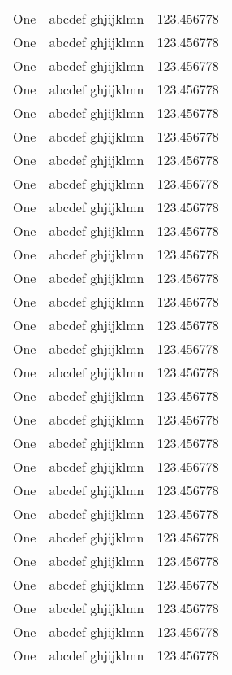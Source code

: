 \begin{landscape}
\begin{center}
\tablelasttail{\hline}
\par
\begin{supertabular}{| r @{\quad -sep- }| r@{\hspace{6 cm}}| r |}
One & abcdef ghjijklmn & 123.456778 \\
One & abcdef ghjijklmn & 123.456778 \\
One & abcdef ghjijklmn & 123.456778 \\
One & abcdef ghjijklmn & 123.456778 \\[5mm]%
One & abcdef ghjijklmn & 123.456778 \\
One & abcdef ghjijklmn & 123.456778 \\
One & abcdef ghjijklmn & 123.456778 \\
One & abcdef ghjijklmn & 123.456778 \\
One & abcdef ghjijklmn & 123.456778 \\
\hline
One & abcdef ghjijklmn & 123.456778 \\
One & abcdef ghjijklmn & 123.456778 \\
One & abcdef ghjijklmn & 123.456778 \\
One & abcdef ghjijklmn & 123.456778 \\
One & abcdef ghjijklmn & 123.456778 \\
One & abcdef ghjijklmn & 123.456778 \\
One & abcdef ghjijklmn & 123.456778 \\
One & abcdef ghjijklmn & 123.456778 \\
One & abcdef ghjijklmn & 123.456778 \\
One & abcdef ghjijklmn & 123.456778 \\
One & abcdef ghjijklmn & 123.456778 \\
One & abcdef ghjijklmn & 123.456778 \\
One & abcdef ghjijklmn & 123.456778 \\
One & abcdef ghjijklmn & 123.456778 \\
One & abcdef ghjijklmn & 123.456778 \\
One & abcdef ghjijklmn & 123.456778 \\
One & abcdef ghjijklmn & 123.456778 \\
One & abcdef ghjijklmn & 123.456778 \\
One & abcdef ghjijklmn & 123.456778 \\

\end{supertabular}
\end{center}
\end{landscape}
